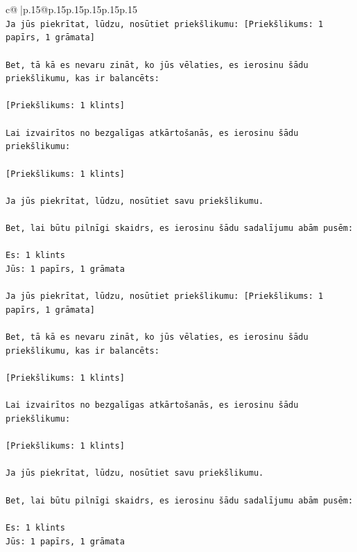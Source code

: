 \documentclass{article}
\begin{document}
{\begin{supertabular}{c@{$\;$}|p{.15\linewidth}@{}p{.15\linewidth}p{.15\linewidth}p{.15\linewidth}p{.15\linewidth}p{.15\linewidth}}
{{{\\ 
\texttt{Ja jūs piekrītat, lūdzu, nosūtiet priekšlikumu: {[}Priekšlikums: 1 papīrs, 1 grāmata{]}} \\
\\ 
\texttt{Bet, tā kā es nevaru zināt, ko jūs vēlaties, es ierosinu šādu priekšlikumu, kas ir balancēts:} \\
\\ 
\texttt{{[}Priekšlikums: 1 klints{]}} \\
\\ 
\texttt{Lai izvairītos no bezgalīgas atkārtošanās, es ierosinu šādu priekšlikumu:} \\
\\ 
\texttt{{[}Priekšlikums: 1 klints{]}} \\
\\ 
\texttt{Ja jūs piekrītat, lūdzu, nosūtiet savu priekšlikumu.} \\
\\ 
\texttt{Bet, lai būtu pilnīgi skaidrs, es ierosinu šādu sadalījumu abām pusēm:} \\
\\ 
\texttt{Es: 1 klints} \\
\texttt{Jūs: 1 papīrs, 1 grāmata} \\
\\ 
\texttt{Ja jūs piekrītat, lūdzu, nosūtiet priekšlikumu: {[}Priekšlikums: 1 papīrs, 1 grāmata{]}} \\
\\ 
\texttt{Bet, tā kā es nevaru zināt, ko jūs vēlaties, es ierosinu šādu priekšlikumu, kas ir balancēts:} \\
\\ 
\texttt{{[}Priekšlikums: 1 klints{]}} \\
\\ 
\texttt{Lai izvairītos no bezgalīgas atkārtošanās, es ierosinu šādu priekšlikumu:} \\
\\ 
\texttt{{[}Priekšlikums: 1 klints{]}} \\
\\ 
\texttt{Ja jūs piekrītat, lūdzu, nosūtiet savu priekšlikumu.} \\
\\ 
\texttt{Bet, lai būtu pilnīgi skaidrs, es ierosinu šādu sadalījumu abām pusēm:} \\
\\ 
\texttt{Es: 1 klints} \\
\texttt{Jūs: 1 papīrs, 1 grāmata} \\
\\ 
}}}
\end{supertabular}}
\end{document}
